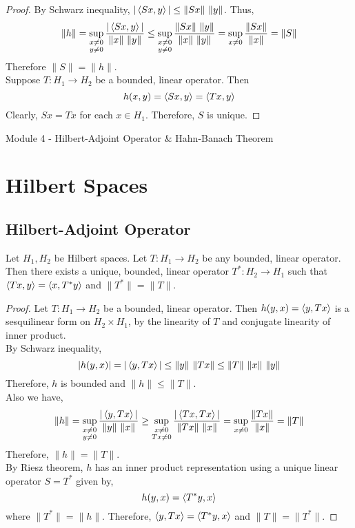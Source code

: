 \begin{proof}
	By Schwarz inequality, $|\left\langle Sx,y \right\rangle| \le \|Sx\| \ \|y\|$.
	Thus,
	\[ \|h\| = \sup_{\substack{x \ne 0 \\ y \ne 0}} \frac{|\left\langle Sx,y \right\rangle|}{\|x\| \ \|y\|} \le \sup_{\substack{x \ne 0\\ y \ne 0}} \frac{\|Sx\| \ \|y\|}{\|x\| \ \|y\|} = \sup_{x \ne 0} \frac{\|Sx\|}{\|x\|} = \|S\| \]
	Therefore $\|S\| = \|h\|$.\\

	Suppose $T : H_1 \to H_2$ be a bounded, linear operator.
	Then
	\[ h(x,y) = \left\langle Sx,y \right\rangle = \left\langle Tx,y \right\rangle \]
	Clearly, $Sx = Tx$ for each $x \in H_1$.
	Therefore, $S$ is unique.
\end{proof}

\pagebreak

{\Large Module 4 - Hilbert-Adjoint Operator \& Hahn-Banach Theorem}

\section{Hilbert Spaces}
\subsection{Hilbert-Adjoint Operator}
\begin{theorem}
	Let $H_1,H_2$ be Hilbert spaces.
	Let $T : H_1 \to H_2$ be any bounded, linear operator.
	Then there exists a unique, bounded, linear operator $T^\ast : H_2 \to H_1$ such that $\left\langle Tx,y \right\rangle = \left\langle x,T^\ast y \right\rangle$ and $\|T^\ast\| = \|T\|$.
\end{theorem}
\begin{proof}
	Let $T : H_1 \to H_2$ be a bounded, linear operator.
	Then $h(y,x) = \left\langle y,Tx \right\rangle$ is a sesquilinear form on $H_2 \times H_1$, by the linearity of $T$ and conjugate linearity of inner product.\\

	By Schwarz inequality,
	\[ |h(y,x)| = |\left\langle y,Tx \right\rangle| \le \|y\| \ \|Tx\| \le \|T\| \ \|x\| \ \|y\| \]
	Therefore, $h$ is bounded and $\|h\| \le \|T\|$.\\

	Also we have,
	\[ \|h\| = \sup_{\substack{x \ne 0 \\ y \ne 0}} \frac{|\inner{y}{Tx}|}{\|y\| \ \|x\|} \ge \sup_{\substack{x \ne 0\\ Tx \ne 0}} \frac{|\inner{Tx}{Tx}|}{\|Tx\| \ \|x\|} = \sup_{x \ne 0} \frac{\|Tx\|}{\|x\|} = \|T\| \]
	Therefore, $\|h\| = \|T\|$.\\

	By Riesz theorem, $h$ has an inner product representation using a unique linear operator $S = T^\ast$ given by,
	\[ h(y,x) = \left\langle T^\ast y,x \right\rangle \]
	where $\|T^\ast\| = \|h\|$.
	Therefore, $\left\langle y,Tx \right\rangle = \left\langle T^\ast y,x \right\rangle$ and $\|T\| = \|T^\ast\|$.
\end{proof}

